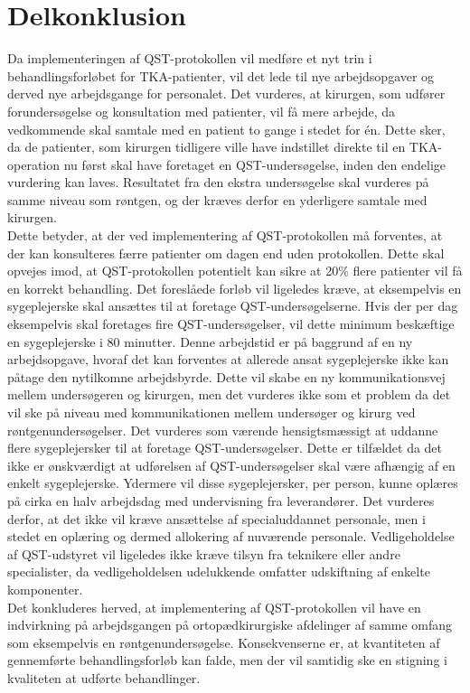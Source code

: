\section{Delkonklusion}
Da implementeringen af QST-protokollen vil medføre et nyt trin i behandlingsforløbet for TKA-patienter, vil det lede til nye arbejdsopgaver og derved nye arbejdsgange for personalet. Det vurderes, at kirurgen, som udfører forundersøgelse og konsultation med patienter, vil få mere arbejde, da vedkommende skal samtale med en patient to gange i stedet for én. Dette sker, da de patienter, som kirurgen tidligere ville have indstillet direkte til en TKA-operation nu først skal have foretaget en QST-undersøgelse, inden den endelige vurdering kan laves. Resultatet fra den ekstra undersøgelse skal vurderes på samme niveau som røntgen, og der kræves derfor en yderligere samtale med kirurgen. \\
Dette betyder, at der ved implementering af QST-protokollen må forventes, at der kan konsulteres færre patienter om dagen end uden protokollen. Dette skal opvejes imod, at QST-protokollen potentielt kan sikre at 20\% flere patienter vil få en korrekt behandling. Det foreslåede forløb vil ligeledes kræve, at eksempelvis en sygeplejerske skal ansættes til at foretage QST-undersøgelserne. Hvis der per dag eksempelvis skal foretages fire QST-undersøgelser, vil dette minimum beskæftige en sygeplejerske i 80 minutter. Denne arbejdstid er på baggrund af en ny arbejdsopgave, hvoraf det kan forventes at allerede ansat sygeplejerske ikke kan påtage den nytilkomne arbejdsbyrde. Dette vil skabe en ny kommunikationsvej mellem undersøgeren og kirurgen, men det vurderes ikke som et problem da det vil ske på niveau med kommunikationen mellem undersøger og kirurg ved røntgenundersøgelser. Det vurderes som værende hensigtsmæssigt at uddanne flere sygeplejersker til at foretage QST-undersøgelser. Dette er tilfældet da det ikke er ønskværdigt at udførelsen af QST-undersøgelser skal være afhængig af en enkelt sygeplejerske. Ydermere vil disse sygeplejersker, per person, kunne oplæres på cirka en halv arbejdsdag med undervisning fra leverandører. Det vurderes derfor, at det ikke vil kræve ansættelse af specialuddannet personale, men i stedet en oplæring og dermed allokering af nuværende personale. Vedligeholdelse af QST-udstyret vil ligeledes ikke kræve tilsyn fra teknikere eller andre specialister, da vedligeholdelsen udelukkende omfatter udskiftning af enkelte komponenter. \\
Det konkluderes herved, at implementering af QST-protokollen vil have en indvirkning på arbejdsgangen på ortopædkirurgiske afdelinger af samme omfang som eksempelvis en røntgenundersøgelse. Konsekvenserne er, at kvantiteten af gennemførte behandlingsforløb kan falde, men der vil samtidig ske en stigning i kvaliteten at udførte behandlinger.
